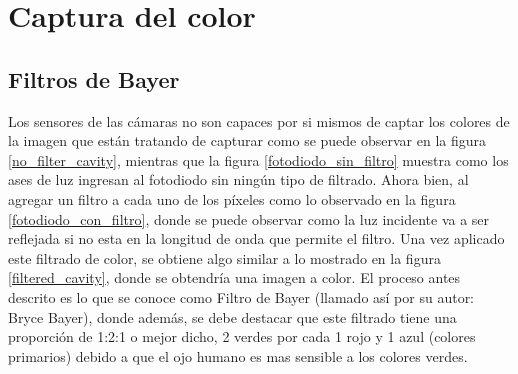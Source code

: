 \documentclass[conference]{IEEEtran}
\begin{document}
\section{\textbf{Captura del color}}

\subsection{\textbf{Filtros de Bayer}}
Los sensores de las cámaras no son capaces por si mismos de captar los colores de la imagen que están tratando de capturar como se puede observar en la figura \ref{no_filter_cavity}, mientras que la figura \ref{fotodiodo_sin_filtro} muestra como los ases de luz ingresan al fotodiodo sin ningún tipo de filtrado. Ahora bien, al agregar un filtro a cada uno de los píxeles como lo observado en la figura \ref{fotodiodo_con_filtro}, donde se puede observar como la luz incidente va a ser reflejada si no esta en la longitud de onda que permite el filtro. Una vez aplicado este filtrado de color, se obtiene algo similar a lo mostrado en la figura \ref{filtered_cavity}, donde se obtendría una imagen a color. El proceso antes descrito es lo que se conoce como Filtro de Bayer (llamado así por su autor: Bryce Bayer), donde además, se debe destacar que este filtrado tiene una proporción de 1:2:1 o mejor dicho, 2 verdes por cada 1 rojo y 1 azul (colores primarios) debido a que el ojo humano es mas sensible a los colores verdes\cite{bayer2}.
\end{document}
